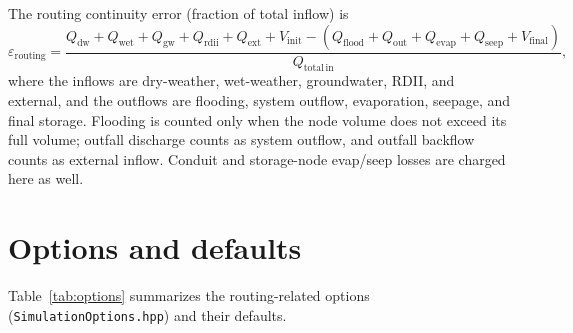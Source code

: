 \documentclass[11pt,a4paper]{article}
\begin{document}
The routing continuity error (fraction of total inflow) is
\begin{equation}
  \varepsilon_{\mathrm{routing}} = \frac{Q_{\mathrm{dw}} + Q_{\mathrm{wet}} +
    Q_{\mathrm{gw}} + Q_{\mathrm{rdii}} + Q_{\mathrm{ext}} +
    V_{\mathrm{init}} - \left(Q_{\mathrm{flood}} + Q_{\mathrm{out}} +
    Q_{\mathrm{evap}} + Q_{\mathrm{seep}} + V_{\mathrm{final}}\right)}
    {Q_{\mathrm{total\,in}}},
\end{equation}
where the inflows are dry-weather, wet-weather, groundwater, RDII, and external,
and the outflows are flooding, system outflow, evaporation, seepage, and final
storage. Flooding is counted only when the node volume does not exceed its full
volume; outfall discharge counts as system outflow, and outfall backflow counts
as external inflow. Conduit and storage-node evap/seep losses are charged here
as well.

\section{Options and defaults}

Table~\ref{tab:options} summarizes the routing-related options
(\texttt{SimulationOptions.hpp}) and their defaults.
\end{document}

